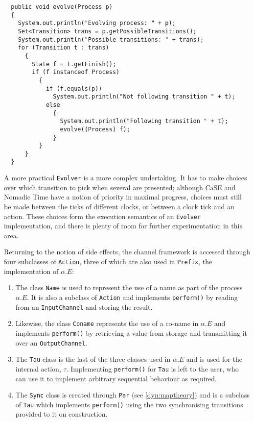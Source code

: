 \begin{verbatim}
  public void evolve(Process p)
  {
    System.out.println("Evolving process: " + p);
    Set<Transition> trans = p.getPossibleTransitions();
    System.out.println("Possible transitions: " + trans);
    for (Transition t : trans)
      {
        State f = t.getFinish();
        if (f instanceof Process)
          {
            if (f.equals(p))
              System.out.println("Not following transition " + t);
            else
              {
                System.out.println("Following transition " + t);
                evolve((Process) f);
              }
          }
      }
  }
\end{verbatim}

A more practical \texttt{Evolver} is a more complex undertaking.  It
has to make choices over which transition to pick when several are
presented; although CaSE and Nomadic Time have a notion of priority in
maximal progress, choices must still be made between the ticks of
different clocks, or between a clock tick and an action.  These
choices form the execution semantics of an \texttt{Evolver}
implementation, and there is plenty of room for further
experimentation in this area.

Returning to the notion of side effects, the channel framework is
accessed through four subclasses of \texttt{Action}, three of which
are also used in \texttt{Prefix}, the implementation of $\alpha.E$:

\begin{enumerate}
\item The class \texttt{Name} is used to represent the use of a name
  as part of the process $\alpha.E$.  It is also a subclass of
  \texttt{Action} and implements \texttt{perform()} by reading from an
  \texttt{InputChannel} and storing the result.
\item Likewise, the class \texttt{Coname} represents the use of a
  co-name in $\alpha.E$ and implements \texttt{perform()} by
  retrieving a value from storage and transmitting it over an
  \texttt{OutputChannel}.
\item The \texttt{Tau} class is the last of the three classes used in
  $\alpha.E$ and is used for the internal action, $\tau$.
  Implementing \texttt{perform()} for \texttt{Tau} is left to the
  user, who can use it to implement arbitrary sequential behaviour as
  required.
\item The \texttt{Sync} class is created through \texttt{Par} (see
  \ref{dyn:maptheory}) and is a subclass of \texttt{Tau} which
  implements \texttt{perform()} using the two synchronising
  transitions provided to it on construction.
\end{enumerate}

